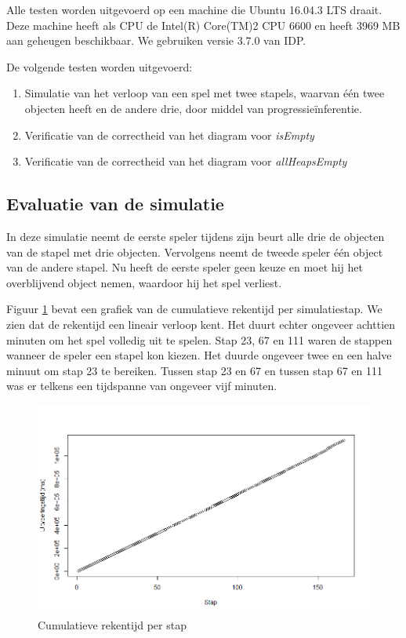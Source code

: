 Alle testen worden uitgevoerd op een machine die Ubuntu 16.04.3 LTS draait. Deze machine heeft als CPU de Intel(R) Core(TM)2 CPU 6600 en heeft 3969 MB aan geheugen beschikbaar. We gebruiken versie 3.7.0 van IDP.

De volgende testen worden uitgevoerd:

\begin{enumerate}
	\item Simulatie van het verloop van een spel met twee stapels, waarvan \'e\'en twee objecten heeft en de andere drie, door middel van progressie\"inferentie.
	\item Verificatie van de correctheid van het diagram voor \textit{isEmpty}
	\item Verificatie van de correctheid van het diagram voor \textit{allHeapsEmpty} 
\end{enumerate}

\subsection{Evaluatie van de simulatie}

In deze simulatie neemt de eerste speler tijdens zijn beurt alle drie de objecten van de stapel met drie objecten. Vervolgens neemt de tweede speler \'e\'en object van de andere stapel. Nu heeft de eerste speler geen keuze en moet hij het overblijvend object nemen, waardoor hij het spel verliest.

Figuur \ref{fig:ms} bevat een grafiek van de cumulatieve rekentijd per simulatiestap. We zien dat de rekentijd een lineair verloop kent. Het duurt echter ongeveer achttien minuten om het spel volledig uit te spelen. Stap 23, 67 en 111 waren de stappen wanneer de speler een stapel kon kiezen. Het duurde ongeveer twee en een halve minuut om stap 23 te bereiken. Tussen stap 23 en 67 en tussen stap 67 en 111 was er telkens een tijdspanne van ongeveer vijf minuten.

\begin{figure}
	\includegraphics[width=1.05\textwidth]{chap-evaluatie/ms.png}
	\caption{Cumulatieve rekentijd per stap}
	\label{fig:ms}
\end{figure}

